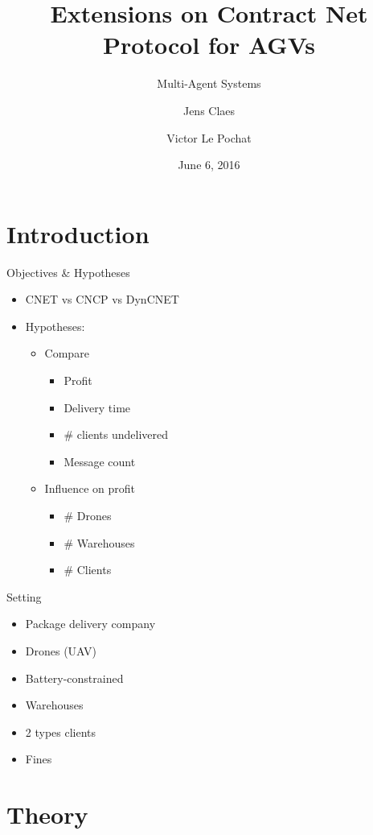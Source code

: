 \documentclass{beamer}
\title{Extensions on Contract Net Protocol for AGVs}
\subtitle{Multi-Agent Systems}
\author{Jens Claes \and Victor Le Pochat}
\date{June 6, 2016}
\begin{document}
	\frame{\titlepage}

	\section{Introduction}
	
	\begin{frame}{Objectives \& Hypotheses}
		\begin{itemize}
		\item CNET vs CNCP vs DynCNET
		\item Hypotheses:
			\begin{itemize}
			\item Compare
				\begin{itemize}
				\item Profit
				\item Delivery time
				\item \# clients undelivered
				\item Message count
				\end{itemize}
			\item Influence on profit
				\begin{itemize}
				\item \# Drones
				\item \# Warehouses
				\item \# Clients
				\end{itemize}
			\end{itemize}
		\end{itemize}
	\end{frame}
		
	\begin{frame}{Setting}
		\begin{itemize}
		\item Package delivery company
		\item Drones (UAV)
		\item Battery-constrained
		\item Warehouses
		\item 2 types clients
		\item Fines
		\end{itemize}
	\end{frame}

	\section{Theory}
	
\end{document}
